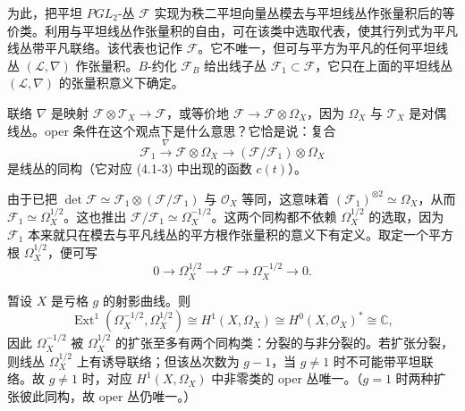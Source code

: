 
为此，把平坦 $PGL_2$-丛 $\mathcal{F}$ 实现为秩二平坦向量丛模去与平坦线丛作张量积后的等价类。利用与平坦线丛作张量积的自由，可在该类中选取代表，使其行列式为平凡线丛带平凡联络。该代表也记作 $\mathcal{F}$。它不唯一，但可与平方为平凡的任何平坦线丛 $(\mathcal{L},\nabla)$ 作张量积。$B$-约化 $\mathcal{F}_B$ 给出线子丛 $\mathcal{F}_1\subset\mathcal{F}$，它只在上面的平坦线丛 $(\mathcal{L},\nabla)$ 的张量积意义下确定。

联络 $\nabla$ 是映射 $\mathcal{F}\otimes\mathcal{T}_X\to\mathcal{F}$，或等价地 $\mathcal{F}\to\mathcal{F}\otimes\Omega_X$，因为 $\Omega_X$ 与 $\mathcal{T}_X$ 是对偶线丛。oper 条件在这个观点下是什么意思？它恰是说：复合
\[
    \mathcal{F}_1\xrightarrow{\ \nabla\ }\mathcal{F}\otimes\Omega_X\longrightarrow(\mathcal{F}/\mathcal{F}_1)\otimes\Omega_X
\]
是线丛的同构（它对应 (4.1-3) 中出现的函数 $c(t)$）。

由于已把 $\det\mathcal{F}\simeq\mathcal{F}_1\otimes(\mathcal{F}/\mathcal{F}_1)$ 与 $\mathcal{O}_X$ 等同，这意味着 $(\mathcal{F}_1)^{\otimes2}\simeq\Omega_X$，从而 $\mathcal{F}_1\simeq\Omega_X^{1/2}$。这也推出 $\mathcal{F}/\mathcal{F}_1\simeq\Omega_X^{-1/2}$。这两个同构都不依赖 $\Omega_X^{1/2}$ 的选取，因为 $\mathcal{F}_1$ 本来就只在模去与平凡线丛的平方根作张量积的意义下有定义。取定一个平方根 $\Omega_X^{1/2}$，便可写
\[
    0\longrightarrow\Omega_X^{1/2}\longrightarrow\mathcal{F}\longrightarrow\Omega_X^{-1/2}\longrightarrow 0.
\]

暂设 $X$ 是亏格 $g$ 的射影曲线。则
\[
    \operatorname{Ext}^1(\Omega_X^{-1/2},\Omega_X^{1/2})\cong H^1(X,\Omega_X)\cong H^0(X,\mathcal{O}_X)^*\cong\mathbb{C},
\]
因此 $\Omega_X^{-1/2}$ 被 $\Omega_X^{1/2}$ 的扩张至多有两个同构类：分裂的与非分裂的。若扩张分裂，则线丛 $\Omega_X^{1/2}$ 上有诱导联络；但该丛次数为 $g-1$，当 $g\ne1$ 时不可能带平坦联络。故 $g\ne1$ 时，对应 $H^1(X,\Omega_X)$ 中非零类的 oper 丛唯一。（$g=1$ 时两种扩张彼此同构，故 oper 丛仍唯一。）


